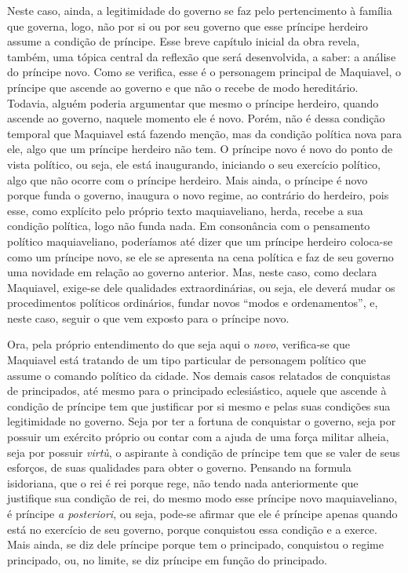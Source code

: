 Neste caso, ainda, a legitimidade do governo se faz pelo pertencimento à
família que governa, logo, não por si ou por seu governo que esse
príncipe herdeiro assume a condição de príncipe. Esse breve capítulo
inicial da obra revela, também, uma tópica central da reflexão que será
desenvolvida, a saber: a análise do príncipe novo. Como se verifica,
esse é o personagem principal de Maquiavel, o príncipe que ascende ao
governo e que não o recebe de modo hereditário. Todavia, alguém poderia
argumentar que mesmo o príncipe herdeiro, quando ascende ao governo,
naquele momento ele é novo. Porém, não é dessa condição temporal que
Maquiavel está fazendo menção, mas da condição política nova para ele,
algo que um príncipe herdeiro não tem. O príncipe novo é novo do ponto
de vista político, ou seja, ele está inaugurando, iniciando o seu
exercício político, algo que não ocorre com o príncipe herdeiro. Mais
ainda, o príncipe é novo porque funda o governo, inaugura o novo regime,
ao contrário do herdeiro, pois esse, como explícito pelo próprio texto
maquiaveliano, herda, recebe a sua condição política, logo não funda
nada. Em consonância com o pensamento político maquiaveliano, poderíamos
até dizer que um príncipe herdeiro coloca-se como um príncipe novo, se
ele se apresenta na cena política e faz de seu governo uma novidade em
relação ao governo anterior. Mas, neste caso, como declara Maquiavel,
exige-se dele qualidades extraordinárias, ou seja, ele deverá mudar os
procedimentos políticos ordinários, fundar novos ``modos e
ordenamentos'', e, neste caso, seguir o que vem exposto para o príncipe
novo.

Ora, pela próprio entendimento do que seja aqui o \emph{novo},
verifica-se que Maquiavel está tratando de um tipo particular de
personagem político que assume o comando político da cidade. Nos demais
casos relatados de conquistas de principados, até mesmo para o
principado eclesiástico, aquele que ascende à condição de príncipe tem
que justificar por si mesmo e pelas suas condições sua legitimidade no
governo. Seja por ter a fortuna de conquistar o governo, seja por
possuir um exército próprio ou contar com a ajuda de uma força militar
alheia, seja por possuir \emph{virtù}, o aspirante à condição de
príncipe tem que se valer de seus esforços, de suas qualidades para
obter o governo. Pensando na formula isidoriana, que o rei é rei porque
rege, não tendo nada anteriormente que justifique sua condição de rei,
do mesmo modo esse príncipe novo maquiaveliano, é príncipe \emph{a
posteriori}, ou seja, pode-se afirmar que ele é príncipe apenas quando
está no exercício de seu governo, porque conquistou essa condição e a
exerce. Mais ainda, se diz dele príncipe porque tem o principado,
conquistou o regime principado, ou, no limite, se diz príncipe em função
do principado.

